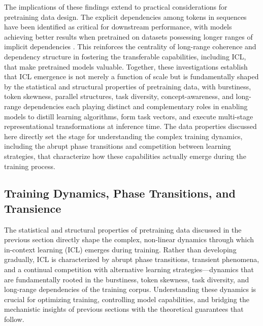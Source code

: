 \documentclass[11pt]{article}
\begin{document}
The implications of these findings extend to practical considerations for pretraining data design. The explicit dependencies among tokens in sequences have been identified as critical for downstream performance, with models achieving better results when pretrained on datasets possessing longer ranges of implicit dependencies \cite{ref72}. This reinforces the centrality of long-range coherence and dependency structure in fostering the transferable capabilities, including ICL, that make pretrained models valuable. Together, these investigations establish that ICL emergence is not merely a function of scale but is fundamentally shaped by the statistical and structural properties of pretraining data, with burstiness, token skewness, parallel structures, task diversity, concept-awareness, and long-range dependencies each playing distinct and complementary roles in enabling models to distill learning algorithms, form task vectors, and execute multi-stage representational transformations at inference time. The data properties discussed here directly set the stage for understanding the complex training dynamics, including the abrupt phase transitions and competition between learning strategies, that characterize how these capabilities actually emerge during the training process.

\subsection{Training Dynamics, Phase Transitions, and Transience}

The statistical and structural properties of pretraining data discussed in the previous section directly shape the complex, non-linear dynamics through which in-context learning (ICL) emerges during training. Rather than developing gradually, ICL is characterized by abrupt phase transitions, transient phenomena, and a continual competition with alternative learning strategies---dynamics that are fundamentally rooted in the burstiness, token skewness, task diversity, and long-range dependencies of the training corpus. Understanding these dynamics is crucial for optimizing training, controlling model capabilities, and bridging the mechanistic insights of previous sections with the theoretical guarantees that follow.
\end{document}
